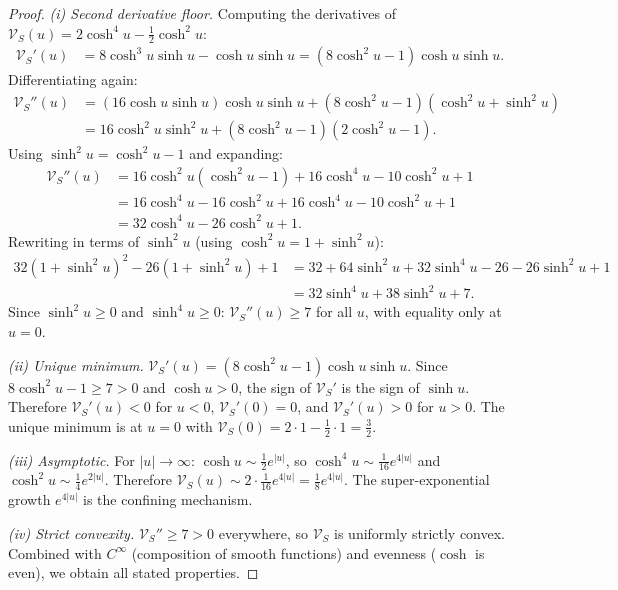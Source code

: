 \documentclass[12pt]{article}
\theoremstyle{plain}
\theoremstyle{definition}
\numberwithin{equation}{section}
\begin{document}
\begin{proof}
\emph{(i) Second derivative floor.}
Computing the derivatives of $\mathcal{V}_S(u)=2\cosh^4 u-\frac{1}{2}\cosh^2 u$:
\begin{align}
\mathcal{V}_S'(u) &= 8\cosh^3 u\sinh u-\cosh u\sinh u = (8\cosh^2 u-1)\cosh u\sinh u.
\end{align}
Differentiating again:
\begin{align}
\mathcal{V}_S''(u) &= (16\cosh u\sinh u)\cosh u\sinh u+(8\cosh^2 u-1)(\cosh^2 u+\sinh^2 u)\\
&= 16\cosh^2 u\sinh^2 u+(8\cosh^2 u-1)(2\cosh^2 u-1).
\end{align}
Using $\sinh^2 u=\cosh^2 u-1$ and expanding:
\begin{align}
\mathcal{V}_S''(u) &= 16\cosh^2 u(\cosh^2 u-1)+16\cosh^4 u-10\cosh^2 u+1\\
&= 16\cosh^4 u-16\cosh^2 u+16\cosh^4 u-10\cosh^2 u+1\\
&= 32\cosh^4 u-26\cosh^2 u+1.
\end{align}
Rewriting in terms of $\sinh^2 u$ (using $\cosh^2 u=1+\sinh^2 u$):
\begin{align}
32(1+\sinh^2 u)^2-26(1+\sinh^2 u)+1 &= 32+64\sinh^2 u+32\sinh^4 u-26-26\sinh^2 u+1\\
&= 32\sinh^4 u+38\sinh^2 u+7.
\end{align}
Since $\sinh^2 u\geq 0$ and $\sinh^4 u\geq 0$: $\mathcal{V}_S''(u)\geq 7$ for all $u$, with equality only at $u=0$.

\emph{(ii) Unique minimum.}
$\mathcal{V}_S'(u)=(8\cosh^2 u-1)\cosh u\sinh u$.  Since $8\cosh^2 u-1\geq 7>0$ and $\cosh u>0$, the sign of $\mathcal{V}_S'$ is the sign of $\sinh u$.  Therefore $\mathcal{V}_S'(u)<0$ for $u<0$, $\mathcal{V}_S'(0)=0$, and $\mathcal{V}_S'(u)>0$ for $u>0$.  The unique minimum is at $u=0$ with $\mathcal{V}_S(0)=2\cdot 1-\frac{1}{2}\cdot 1=\frac{3}{2}$.

\emph{(iii) Asymptotic.}
For $|u|\to\infty$: $\cosh u\sim\frac{1}{2}e^{|u|}$, so $\cosh^4 u\sim\frac{1}{16}e^{4|u|}$ and $\cosh^2 u\sim\frac{1}{4}e^{2|u|}$.  Therefore $\mathcal{V}_S(u)\sim 2\cdot\frac{1}{16}e^{4|u|}=\frac{1}{8}e^{4|u|}$.  The super-exponential growth $e^{4|u|}$ is the confining mechanism.

\emph{(iv) Strict convexity.}
$\mathcal{V}_S''\geq 7>0$ everywhere, so $\mathcal{V}_S$ is uniformly strictly convex.  Combined with $C^\infty$ (composition of smooth functions) and evenness ($\cosh$ is even), we obtain all stated properties.
\end{proof}
\end{document}
